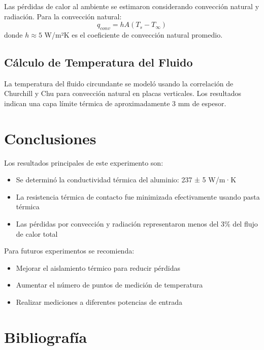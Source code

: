 \documentclass[9pt,a4paper,twocolumn,twoside]{lab-class/lab}
\begin{document}
        Las pérdidas de calor al ambiente se estimaron considerando convección natural y radiación. Para la convección natural:
        \begin{equation}
            q_{conv} = h A (T_s - T_{\infty})
        \end{equation}
        donde $h \approx 5$ W/m²K es el coeficiente de convección natural promedio.

    \subsection{Cálculo de Temperatura del Fluido}

        La temperatura del fluido circundante se modeló usando la correlación de Churchill y Chu para convección natural en placas verticales. Los resultados indican una capa límite térmica de aproximadamente 3 mm de espesor.

\section{Conclusiones}

    Los resultados principales de este experimento son:
    \begin{itemize}
        \item Se determinó la conductividad térmica del aluminio: 237 ± 5 W/m·K
        \item La resistencia térmica de contacto fue minimizada efectivamente usando pasta térmica
        \item Las pérdidas por convección y radiación representaron menos del 3\% del flujo de calor total
    \end{itemize}

    Para futuros experimentos se recomienda:
    \begin{itemize}
        \item Mejorar el aislamiento térmico para reducir pérdidas
        \item Aumentar el número de puntos de medición de temperatura
        \item Realizar mediciones a diferentes potencias de entrada
    \end{itemize}

\section{Bibliografía}
\end{document}
